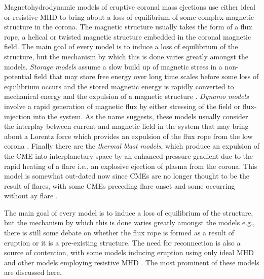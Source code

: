 Magnetohydrodynamic models of eruptive coronal mass ejections use either ideal or resistive MHD to bring about a loss of equilibrium of some complex magnetic structure in the corona. The magnetic structure usually takes the form of a flux rope, a helical or twisted magnetic structure embedded in the coronal magnetic field. The main goal of every model is to induce a loss of equilibrium of the structure, but the mechanism by which this is done varies greatly amongst the models. {\it Storage models} assume a slow build up of magnetic stress in a non-potential field that may store free energy over long time scales before some loss of equilibrium occurs and the stored magnetic energy is rapidly converted to mechanical energy and the expulsion of a magnetic structure \citep{wolfson1998, forbes1995, antiochos1999}. {\it Dynamo models} involve a rapid generation of magnetic flux by either stressing of the field or flux-injection into the system. As the name suggests, these models usually consider the interplay between current and magnetic field in the system that may bring about a Lorentz force which provides an expulsion of the flux rope from the low corona \citep{chen1989, krall2001, schrijver2008, fan2005}. Finally there are the {\it thermal blast models}, which produce an expulsion of the CME into interplanetary space by an enhanced pressure gradient due to the rapid heating of a flare i.e., an explosive ejection of plasma from the corona.  This model is somewhat out-dated now since CMEs are no longer thought to be the result of flares, with some CMEs preceding flare onset and some occurring without ay flare \citep{gosling1993}.

The main goal of every model is to induce a loss of equilibrium of the structure, but the mechanism by which this is done varies greatly amongst the models e.g., there is still some debate on whether the flux rope is formed as a result of eruption or it is a pre-existing structure. The need for reconnection is also a source of contention, with some models inducing eruption using only ideal MHD and other models employing resistive MHD \citep{chen2011}. The most prominent of these models are discussed here.


